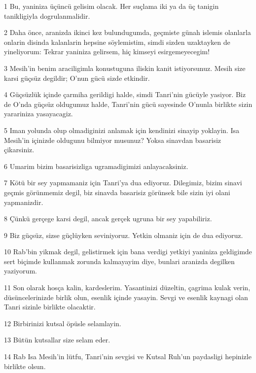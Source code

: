 \par 1 Bu, yaniniza üçüncü gelisim olacak. Her suçlama iki ya da üç tanigin tanikligiyla dogrulanmalidir.
\par 2 Daha önce, aranizda ikinci kez bulundugumda, geçmiste günah islemis olanlarla onlarin disinda kalanlarin hepsine söylemistim, simdi sizden uzaktayken de yineliyorum: Tekrar yaniniza gelirsem, hiç kimseyi esirgemeyecegim!
\par 3 Mesih'in benim araciligimla konustuguna iliskin kanit istiyorsunuz. Mesih size karsi güçsüz degildir; O'nun gücü sizde etkindir.
\par 4 Güçsüzlük içinde çarmiha gerildigi halde, simdi Tanri'nin gücüyle yasiyor. Biz de O'nda güçsüz oldugumuz halde, Tanri'nin gücü sayesinde O'nunla birlikte sizin yarariniza yasayacagiz.
\par 5 Iman yolunda olup olmadiginizi anlamak için kendinizi sinayip yoklayin. Isa Mesih'in içinizde oldugunu bilmiyor musunuz? Yoksa sinavdan basarisiz çikarsiniz.
\par 6 Umarim bizim basarisizliga ugramadigimizi anlayacaksiniz.
\par 7 Kötü bir sey yapmamaniz için Tanri'ya dua ediyoruz. Dilegimiz, bizim sinavi geçmis görünmemiz degil, biz sinavda basarisiz görünsek bile sizin iyi olani yapmanizdir.
\par 8 Çünkü gerçege karsi degil, ancak gerçek ugruna bir sey yapabiliriz.
\par 9 Biz güçsüz, sizse güçlüyken seviniyoruz. Yetkin olmaniz için de dua ediyoruz.
\par 10 Rab'bin yikmak degil, gelistirmek için bana verdigi yetkiyi yaniniza geldigimde sert biçimde kullanmak zorunda kalmayayim diye, bunlari aranizda degilken yaziyorum.
\par 11 Son olarak hosça kalin, kardeslerim. Yasantinizi düzeltin, çagrima kulak verin, düsüncelerinizde birlik olun, esenlik içinde yasayin. Sevgi ve esenlik kaynagi olan Tanri sizinle birlikte olacaktir.
\par 12 Birbirinizi kutsal öpüsle selamlayin.
\par 13 Bütün kutsallar size selam eder.
\par 14 Rab Isa Mesih'in lütfu, Tanri'nin sevgisi ve Kutsal Ruh'un paydasligi hepinizle birlikte olsun.



